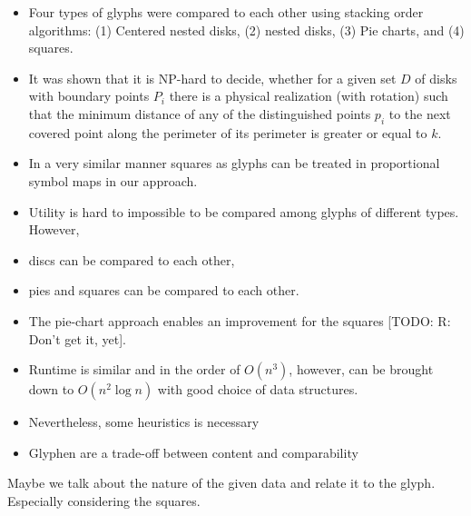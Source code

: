 \documentclass[a4paper,11pt]{article}
\begin{document}
\begin{itemize}
  \item Four types of glyphs were compared to each other using stacking order algorithms: (1) Centered nested disks, (2) nested disks, (3) Pie charts, and (4) squares.
  \item It was shown that it is NP-hard to decide, whether for a given set $D$ of disks with boundary points $P_i$ there is a physical realization (with rotation) such that the minimum distance of any of the distinguished points $p_i$ to the next covered point along the perimeter of its perimeter is greater or equal to $k$.
  \item In a very similar manner squares as glyphs can be treated in proportional symbol maps in our approach.
  \item Utility is hard to impossible to be compared among glyphs of different types. However,
  \item discs can be compared to each other,
  \item pies and squares can be compared to each other.
  \item The pie-chart approach enables an improvement for the squares [TODO: R: Don't get it, yet].
  \item Runtime is similar and in the order of $O(n^3)$, however, can be brought down to $O(n^2 \log n)$ with good choice of data structures.
  \item Nevertheless, some heuristics is necessary
  \item Glyphen are a trade-off between content and comparability
\end{itemize}

Maybe we talk about the nature of the given data and relate it to the glyph. Especially considering the squares.

\newpage
\end{document}
